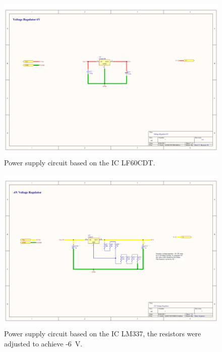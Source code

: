\begin{landscape}
	\begin{figure}[!htpb]
		\centering
		\includegraphics[width=\paperwidth,keepaspectratio]{DGA_PS_6}
		\caption[Positive power supply (\SI{6}{\volt}) for the differential amplifier]{Power supply circuit based on the IC LF60CDT.}
		\label{fig:DGA PS 6}
	\end{figure}
\end{landscape}

\begin{landscape}
	\begin{figure}[!htpb]
		\centering
		\includegraphics[width=\paperwidth,keepaspectratio]{DGA_PS_N6}
		\caption[Negative power supply (\SI{-6}{\volt}) for the differential amplifier]{Power supply circuit based on the IC LM337, the resistors were adjusted to achieve -\SI{6}{\volt}.}
		\label{fig:DGA PS -6}
	\end{figure}
\end{landscape}

